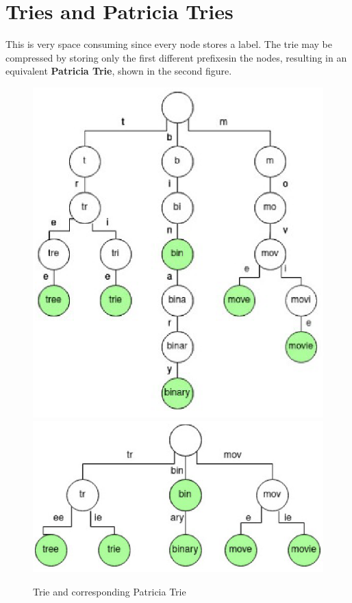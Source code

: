 \section{Tries and Patricia Tries}
\begin{paracol}{2}
   \colfill
   
   This is very space consuming since every node stores a label. 
   The trie may be compressed by storing only the first different prefixes\footnotemark[1]  in the nodes, resulting in an equivalent \textbf{Patricia Trie}, shown in the second figure.
   \colfill
   \switchcolumn
   
   \begin{figure}[htbp]
      \centering
      \includegraphics[width=0.60\columnwidth]{images/trie.png}\\
      \includegraphics{images/patriciatrie2.png}
      \caption{Trie and corresponding Patricia Trie}
      \label{fig:trie}
   \end{figure}
\end{paracol}

